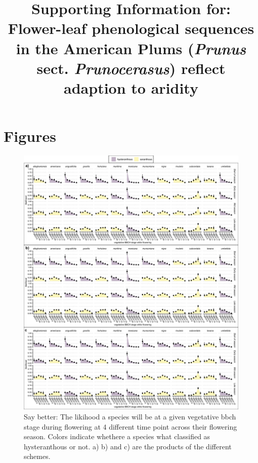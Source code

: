 \documentclass{article}[11pt]
\title{Supporting Information for: Flower-leaf phenological sequences in the American Plums (\textit{Prunus} sect. \textit{Prunocerasus}) reflect adaption to aridity}
\begin{document}

\maketitle

\section*{Figures} 
\begin{figure}[h!]
    \centering
 \includegraphics[width=\textwidth]{..//..//Plots/ord_quants_phylo.jpeg}
    \caption{Say better: The likihood a species will be at a given vegetative bbch stage during flowering at 4 different time point across their flowering season. Colors indicate whethere a species what classified as hysteranthous or not. a) b) and c) are the products of the different schemes.}
    \label{fig:plums}
\end{figure}
\end{document}
